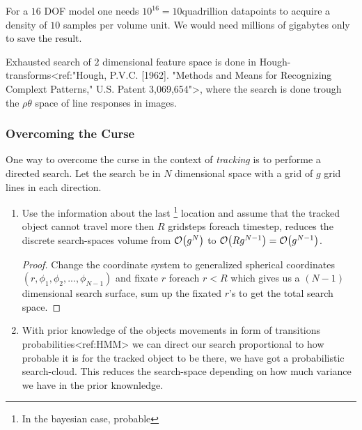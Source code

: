 \begin{example}
    For a $16$ DOF model one needs $10^16=10$quadrillion datapoints to acquire a density
    of $10$ samples per volume unit. We would need millions of gigabytes only to save the result.
\end{example}

\begin{example}
    Exhausted search of $2$ dimensional feature space is done in Hough-transforms<ref:"Hough, P.V.C. [1962]. "Methods and Means for Recognizing Complext Patterns," U.S. Patent 3,069,654">, 
    where the search is done trough the $\rho\theta$ space of line responses in images.
\end{example}

\subsubsection{Overcoming the Curse}
    One way to overcome the curse in the context of \emph{tracking} is to performe a directed search. Let the search be in $N$ dimensional space with a grid of $g$ grid lines in each direction.
    \begin{enumerate}
        \item Use the information about the last \footnote{In the bayesian case, probable} location and assume that the tracked object cannot travel more then 
        $R$ gridsteps foreach timestep, reduces the discrete search-spaces volume from $\mathcal{O}{\left(g^N\right)}$ to $\mathcal{O}{\left(Rg^{N-1}\right)}=\mathcal{O}{\left(g^{N-1}\right)}$.
        \begin{proof}
            Change the coordinate system to generalized spherical coordinates $(r,\phi_1,\phi_2,...,\phi_{N-1})$ and fixate $r$ foreach $r<R$ which gives us a $(N-1)$ dimensional search surface, sum up the fixated $r$'s to get the total search space.
        \end{proof}
        \item With prior knowledge of the objects movements in form of transitions probabilities<ref:HMM> we can direct our search proportional to how probable it is for the tracked object to be there, we have got a probabilistic search-cloud. 
        This reduces the search-space depending on how much variance we have in the prior knownledge.

    \end{enumerate} 

